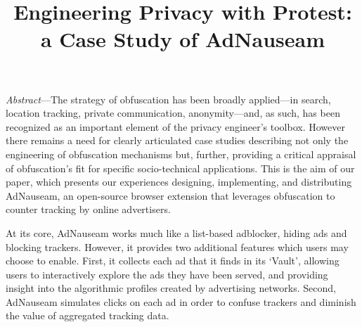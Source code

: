 \documentclass[conference]{IEEEtran}
\begin{document}
\title{Engineering Privacy with Protest:\\a Case Study of AdNauseam}

\author{
\and
{}
}

\maketitle

%
%
%
%



\emph{Abstract}---The strategy of obfuscation has been broadly applied---in search, location tracking, private communication, anonymity---and, as such, has been recognized as an important element of the privacy engineer's toolbox. However there remains a need for clearly articulated case studies describing not only the engineering of obfuscation mechanisms but, further, providing a critical appraisal of obfuscation's fit for specific socio-technical applications. This is the aim of our paper, which presents our experiences designing, implementing, and distributing AdNauseam, an open-source browser extension that leverages obfuscation to counter tracking by online advertisers.

At its core, AdNauseam works much like a list-based adblocker, hiding ads and blocking trackers. However, it provides two additional features which users may choose to enable. First, it collects each ad that it finds in its `Vault', allowing users to interactively explore the ads they have been served, and providing insight into the algorithmic profiles created by advertising networks. Second, AdNauseam simulates clicks on each ad in order to confuse trackers and diminish the value of aggregated tracking data.
\end{document}
